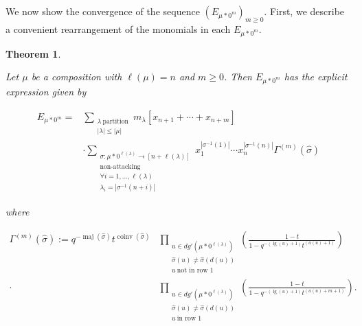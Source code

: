 \documentclass[11pt]{article}
\newtheorem{thm}[theo]{Theorem}
\theoremstyle{definition}
\numberwithin{equation}{section}
\DeclareMathOperator{\maj}{maj}
\DeclareMathOperator{\coinv}{coinv}
\DeclareMathOperator{\mathleg}{lg}
\begin{document}
We now show the convergence of the sequence $(E_{\mu*0^m})_{m \geq 0}$. First, we describe a convenient rearrangement of the monomials in each $E_{\mu*0^m}$.

\begin{thm} \label{HHL tail expansion}

Let $\mu$ be a composition with $\ell(\mu) = n$ and $m \geq 0$. Then $E_{\mu * 0^m}$ has the explicit expression given by 

\begin{align}\label{finite variable expansion eq}
    E_{\mu * 0^m} = {} & {} \sum_{\substack{\lambda ~ \text{partition}  \\ |\lambda| \leq |\mu|}} m_{\lambda}[x_{n+1}+\cdots + x_{n+m}] \\ \nonumber & \cdot \sum_{\substack{\sigma:\mu * 0^{\ell(\lambda)}  \rightarrow [n+\ell(\lambda)]\\ \text{non-attacking} \\ \forall i = 1,\ldots,\ell(\lambda) \\ \lambda_i = |\sigma^{-1}(n+i)|}} x_1 ^{|\sigma^{-1}(1)|}\cdots x_n ^{|\sigma^{-1}(n)|} \Gamma^{(m)} (\widehat{\sigma})
\end{align}

where 

\begin{equation*}
\begin{split}
     \Gamma^{(m)}(\widehat{\sigma}) :=
       q^{-\maj(\widehat{\sigma})}t^{\coinv(\widehat{\sigma})} & \prod_{\substack{ u \in dg'(\mu * 0^{\ell(\lambda)}) \\ \widehat{\sigma}(u) \neq \widehat{\sigma}(d(u)) \\ u ~ \text{not in row } 1 }} \left( \frac{1-t}{1-q^{-(\mathleg(u)+1)}t^{(a(u)+1)}} \right) \\ \cdot & \prod_{\substack{ u \in dg'(\mu * 0^{\ell(\lambda)}) \\ \widehat{\sigma}(u) \neq \widehat{\sigma}(d(u)) \\ u ~ \text{in row } 1 }} \left( \frac{1-t}{1-q^{-(\mathleg(u) +1)}t^{(a(u) + m + 1)}} \right).
\end{split}
\end{equation*}

 
 \end{thm}
 
\end{document}
